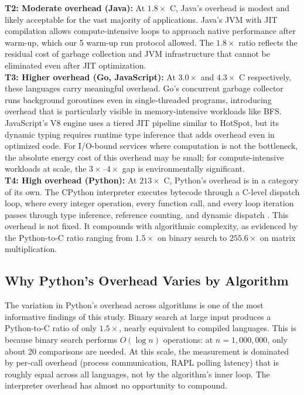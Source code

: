 \textbf{T2: Moderate overhead (Java):} At $1.8\times$ C, Java's overhead is modest and likely acceptable for the vast majority of applications. Java's JVM with JIT compilation allows compute-intensive loops to approach native performance after warm-up, which our 5 warm-up run protocol allowed. The $1.8\times$ ratio reflects the residual cost of garbage collection and JVM infrastructure that cannot be eliminated even after JIT optimization. \\
 
\textbf{T3: Higher overhead (Go, JavaScript):} At $3.0\times$ and $4.3\times$ C respectively, these languages carry meaningful overhead. Go's concurrent garbage collector runs background goroutines even in single-threaded programs, introducing overhead that is particularly visible in memory-intensive workloads like BFS. JavaScript's V8 engine uses a tiered JIT pipeline similar to HotSpot, but its dynamic typing requires runtime type inference that adds overhead even in optimized code. For I/O-bound services where computation is not the bottleneck, the absolute energy cost of this overhead may be small; for compute-intensive workloads at scale, the $3\times$--$4\times$ gap is environmentally significant. \\

\textbf{T4: High overhead (Python):} At $213\times$ C, Python's overhead is in a category of its own. The CPython interpreter executes bytecode through a C-level dispatch loop, where every integer operation, every function call, and every loop iteration passes through type inference, reference counting, and dynamic dispatch \cite{10.1145/2617548.2617552}. This overhead is not fixed. It compounds with algorithmic complexity, as evidenced by the Python-to-C ratio ranging from $1.5\times$ on binary search to $255.6\times$ on matrix multiplication. \\




\subsection{Why Python's Overhead Varies by Algorithm}
 
The variation in Python's overhead across algorithms is one of the most informative findings of this study. Binary search at large input produces a Python-to-C ratio of only $1.5\times$, nearly equivalent to compiled languages. This is because binary search performs $O(\log n)$ operations: at $n = 1{,}000{,}000$, only about 20 comparisons are needed. At this scale, the measurement is dominated by per-call overhead (process communication, RAPL polling latency) that is roughly equal across all languages, not by the algorithm's inner loop. The interpreter overhead has almost no opportunity to compound.
 
